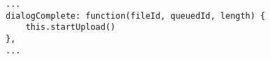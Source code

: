 
\lstset{language=c}

\begin{lstlisting}[frame=single]
...
dialogComplete: function(fileId, queuedId, length) {
	this.startUpload()
},
...
\end{lstlisting}